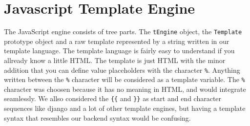 \section{Javascript Template Engine}

The JavaScript engine consists of tree parts. The 
\lstinline$tEngine$ object, the \lstinline$Template$ prototype object and a raw template represented by a string written in our template language. The template language is fairly easy to understand if you allready know a little HTML. The template is just HTML with the minor addition that you can define value placeholders with the character \verb$%$. Anything written between the \verb$%$ character will be considered as a template variable. The \verb$%$ character was choosen because it has no meaning in HTML, and would integrate seamlessly. We allso considered the \verb${{$ and \verb$}}$ as start and end character sequences like django and a lot of other template engines, but having a template syntax that resembles our backend syntax would be confusing.

